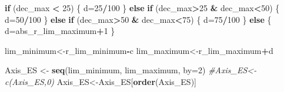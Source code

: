 \documentclass[
]{book}
\newenvironment{Shaded}{\begin{snugshade}}{\end{snugshade}}
\newcommand{\AttributeTok}[1]{\textcolor[rgb]{0.13,0.29,0.53}{#1}}
\newcommand{\CommentTok}[1]{\textcolor[rgb]{0.56,0.35,0.01}{\textit{#1}}}
\newcommand{\ControlFlowTok}[1]{\textcolor[rgb]{0.13,0.29,0.53}{\textbf{#1}}}
\newcommand{\DecValTok}[1]{\textcolor[rgb]{0.00,0.00,0.81}{#1}}
\newcommand{\FunctionTok}[1]{\textcolor[rgb]{0.13,0.29,0.53}{\textbf{#1}}}
\newcommand{\NormalTok}[1]{#1}
\newcommand{\OtherTok}[1]{\textcolor[rgb]{0.56,0.35,0.01}{#1}}
\newcommand{\SpecialCharTok}[1]{\textcolor[rgb]{0.81,0.36,0.00}{\textbf{#1}}}
\begin{document}
\begin{Shaded}
\begin{Highlighting}[]
\ControlFlowTok{if}\NormalTok{ (dec\_max }\SpecialCharTok{\textless{}} \DecValTok{25}\NormalTok{) \{}
\NormalTok{  d}\OtherTok{=}\DecValTok{25}\SpecialCharTok{/}\DecValTok{100}
\NormalTok{\} }\ControlFlowTok{else} \ControlFlowTok{if}\NormalTok{ (dec\_max}\SpecialCharTok{\textgreater{}}\DecValTok{25} \SpecialCharTok{\&}\NormalTok{ dec\_max}\SpecialCharTok{\textless{}}\DecValTok{50}\NormalTok{) \{}
\NormalTok{  d}\OtherTok{=}\DecValTok{50}\SpecialCharTok{/}\DecValTok{100}
\NormalTok{\} }\ControlFlowTok{else} \ControlFlowTok{if}\NormalTok{ (dec\_max}\SpecialCharTok{\textgreater{}}\DecValTok{50} \SpecialCharTok{\&}\NormalTok{ dec\_max}\SpecialCharTok{\textless{}}\DecValTok{75}\NormalTok{) \{}
\NormalTok{  d}\OtherTok{=}\DecValTok{75}\SpecialCharTok{/}\DecValTok{100}
\NormalTok{\} }\ControlFlowTok{else}\NormalTok{ \{}
\NormalTok{  d}\OtherTok{=}\NormalTok{abs\_r\_lim\_maximum}\SpecialCharTok{+}\DecValTok{1}
\NormalTok{\}}

\NormalTok{lim\_minimum}\OtherTok{\textless{}{-}}\NormalTok{r\_lim\_minimum}\SpecialCharTok{{-}}\NormalTok{c}
\NormalTok{lim\_maximum}\OtherTok{\textless{}{-}}\NormalTok{r\_lim\_maximum}\SpecialCharTok{+}\NormalTok{d}

\NormalTok{Axis\_ES }\OtherTok{\textless{}{-}} \FunctionTok{seq}\NormalTok{(lim\_minimum, lim\_maximum, }\AttributeTok{by=}\DecValTok{2}\NormalTok{)}
\CommentTok{\#Axis\_ES\textless{}{-} c(Axis\_ES,0)}
\NormalTok{Axis\_ES}\OtherTok{\textless{}{-}}\NormalTok{Axis\_ES[}\FunctionTok{order}\NormalTok{(Axis\_ES)]}


\end{Highlighting}
\end{Shaded}
\end{document}
